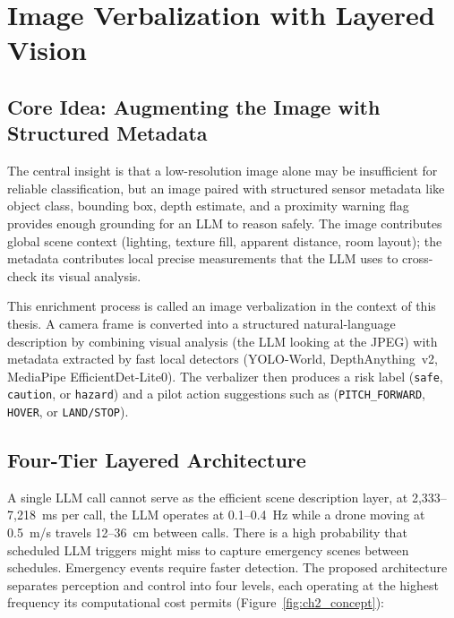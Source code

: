\section{Image Verbalization with Layered Vision}
\label{sec:ch2_proposed}

\subsection{Core Idea: Augmenting the Image with Structured Metadata}
\label{sec:ch2_proposed_idea}

The central insight is that a low-resolution image alone may be insufficient for reliable classification, but an image paired with structured sensor metadata like object class, bounding box, depth estimate, and a proximity warning flag provides enough grounding for an LLM to reason safely. 
The image contributes global scene context (lighting, texture
fill, apparent distance, room layout); the metadata contributes local precise measurements that the LLM uses to cross-check its visual analysis.

This enrichment process is called an image verbalization in the context of this thesis. 
A camera frame is converted into a structured natural-language description by combining visual analysis (the LLM looking at the JPEG) with metadata extracted by fast local detectors (YOLO-World, DepthAnything~v2, MediaPipe EfficientDet-Lite0). 
The verbalizer then produces a risk label (\texttt{safe}, \texttt{caution}, or \texttt{hazard}) and a pilot action suggestions such as (\texttt{PITCH\_FORWARD}, \texttt{HOVER}, or \texttt{LAND/STOP}).

\subsection{Four-Tier Layered Architecture}
\label{sec:ch2_proposed_tiers}

A single LLM call cannot serve as the efficient scene description layer, at 2,333--7,218~ms per call, the LLM operates at 0.1--0.4~Hz while a drone moving at 0.5~m/s travels 12--36~cm between calls. 
There is a high probability that scheduled LLM triggers might miss to capture emergency scenes between schedules.
Emergency events require faster detection. 
The proposed architecture separates perception and control
into four levels, each operating at the highest frequency its computational cost permits (Figure~\ref{fig:ch2_concept}):

